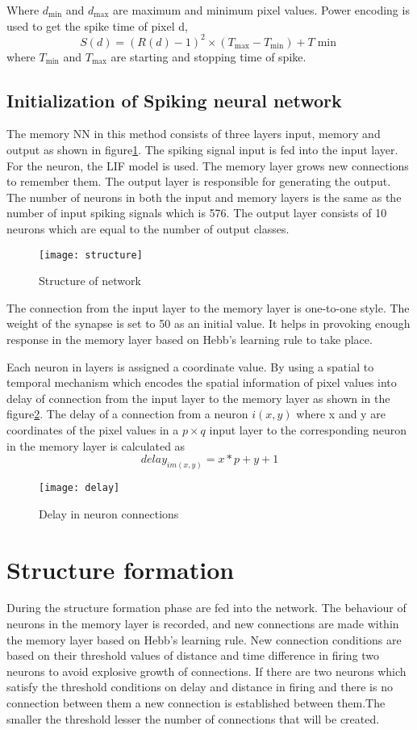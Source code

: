 Where $d_{\min}$ and $d_{\max}$ are maximum and minimum pixel values. Power
encoding is used to get the spike time of pixel d,
\begin{equation*}
    S(d)={(R(d)-1)}^2 \times (T_{\max}-T_{\min})+T{\min}
\end{equation*}
where $T_{\min}$ and $T_{\max}$ are starting and stopping time of spike.
\subsection{Initialization of Spiking neural network}
The memory NN in this method consists of three layers input, memory and output
as shown in figure\ref{structure}. The spiking signal input is fed into the
input layer. For the neuron, the LIF model is used. The memory layer grows new
connections to remember them. The output layer is responsible for generating
the output. The number of neurons in both the input and memory layers is the
same as the number of input spiking signals which is 576. The output layer
consists of 10 neurons which are equal to the number of output classes.
\begin{figure}[h!]
    \centering
    \texttt{[image: structure]}
    \caption{Structure of network}\label{structure}
\end{figure}

The connection from the input layer to the memory layer is one-to-one style.
The weight of the synapse is set to 50 as an initial value. It helps in
provoking enough response in the memory layer based on Hebb's learning
rule\cite{hebbs} to take place.

Each neuron in layers is assigned a coordinate value. By using a spatial to
temporal mechanism which encodes the spatial information of pixel values into
delay of connection from the input layer to the memory layer as shown in the
figure\ref{delay}. The delay of a connection from a neuron $i(x,y)$ where x and
y are coordinates of the pixel values in a $p \times q$ input layer to the
corresponding neuron in the memory layer is calculated as
\begin{equation*}
    delay_{im(x,y)}=x*p+y+1
\end{equation*}
\begin{figure}[h!]
    \centering
    \texttt{[image: delay]}
    \caption{Delay in neuron connections}\label{delay}
\end{figure}
\section{Structure formation}
During the structure formation phase are fed into the network. The behaviour of
neurons in the memory layer is recorded, and new connections are made within
the memory layer based on Hebb's learning rule\cite{hebbs}. New connection
conditions are based on their threshold values of distance and time difference
in firing two neurons to avoid explosive growth of connections. If there are
two neurons which satisfy the threshold conditions on delay and distance in
firing and there is no connection between them a new connection is established
between them.The smaller the threshold lesser the number of connections that
will be created.

